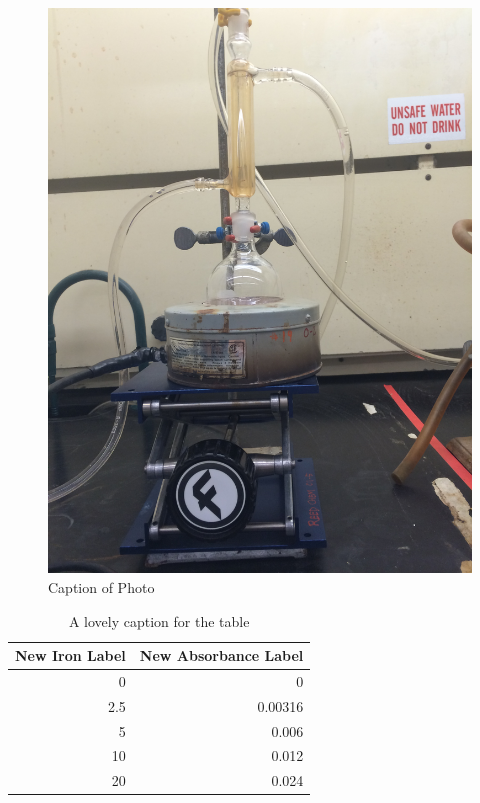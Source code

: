 \documentclass[]{article}
\begin{document}
\clearpage

\begin{figure}[htbp]
\centering
\includegraphics{iron.jpg}
\caption{Caption of Photo}
\end{figure}

\clearpage

\begin{table}[ht]
\centering
\parbox{2.7in}{\caption{A lovely caption for the table}} 
\begin{tabular}{|r|r|}
  \hline
\textbf{New Iron Label} & \textbf{New Absorbance Label} \\ 
  \hline
0 & 0 \\ 
   \hline
    2.5 & 0.00316 \\ 
   \hline
      5 &   0.006 \\ 
   \hline
     10 &   0.012 \\ 
   \hline
     20 &   0.024 \\ 
   \hline
\end{tabular}
\end{table}
\end{document}

